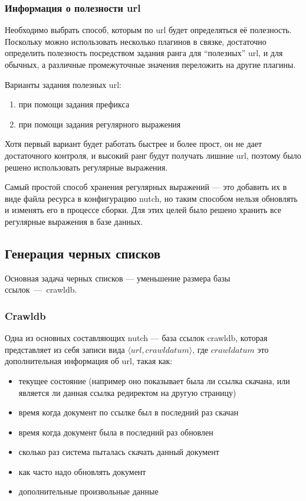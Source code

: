 \subsubsection*{Информация о полезности url}
Необходимо выбрать способ, которым по url будет определяться её полезность. Поскольку можно использовать несколько плагинов в связке, достаточно определить полезность посредством задания ранга для ``полезных'' url, и для обычных, а различные промежуточные значения переложить на другие плагины.

Варианты задания полезных url:
\begin{enumerate}
 \item при помощи задания префикса
 \item при помощи задания регулярного выражения
\end{enumerate}
Хотя первый вариант будет работать быстрее и более прост, он не дает достаточного контроля, и высокий ранг будут получать лишние url, поэтому было решено использовать регулярные выражения.

Самый простой способ хранения регулярных выражений --- это добавить их в виде файла ресурса в конфигурацию nutch, но таким способом нельзя обновлять и изменять его в процессе сборки. Для этих целей было решено хранить все регулярные выражения в базе данных.
\subsection*{Генерация черных списков}
Основная задача черных списков --- уменьшение размера базы ссылок~---~crawldb.

\subsubsection*{Crawldb}
\label{sec:crawldb}
Одна из основных составляющих nutch --- база ссылок crawldb, которая представляет из себя записи вида $\langle url, crawldatum\rangle$, где $crawldatum$ это дополнительная информация об url, такая как:
\begin{itemize}
 \item текущее состояние (например оно показывает была ли ссылка скачана, или является ли данная ссылка редиректом на другую страницу)
 \item время когда документ по ссылке был в последний раз скачан
 \item время когда документ была в последний раз обновлен
 \item сколько раз система пыталась скачать данный документ
 \item как часто надо обновлять документ
 \item дополнительные произвольные данные 
\end{itemize}

